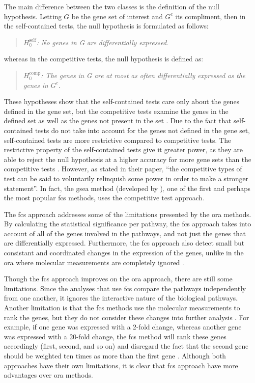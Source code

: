 The main difference between the two classes is the definition of the null hypothesis.
Letting $G$ be the gene set of interest and $G^c$ its compliment, then in the self-contained tests, the null hypothesis is formulated as follows:
\begin{quote}
	\textit{$H_0^{\textrm{self}}$: No genes in G are differentially expressed. }
\end{quote}
whereas in the competitive tests, the null hypothesis is defined as:
\begin{quote}
	\textit{$H_0^{\textrm{comp}}$: The genes in G are at most as often differentially expressed as the genes in $G^c$.
	}
\end{quote}
These hypotheses show that the self-contained tests care only about the genes defined in the gene set, but the competitive tests examine the genes in the defined set as well as the genes not present in the set \citep{Wu2012}.
Due to the fact that self-contained tests do not take into account for the genes not defined in the gene set, self-contained tests are more restrictive compared to competitive tests.
The restrictive property of the self-contained tests give it greater power, as they are able to reject the null hypothesis at a higher accuracy for more gene sets than the competitive tests \citep{Goeman2007}.
However, as \citet{Goeman2007} stated in their paper, ``the competitive types of test can be said to voluntarily relinquish some power in order to make a stronger statement''.
In fact, the \gls{gsea} method (developed by \citet{Subramanian2005}), one of the first and perhaps the most popular \gls{fcs} methods, uses the competitive test approach.

The \Gls{fcs} approach addresses some of the limitations presented by the \gls{ora} methods.
By calculating the statistical significance per pathway, the \gls{fcs} approach takes into account of all of the genes involved in the pathways, and not just the genes that are differentially expressed.
Furthermore, the \gls{fcs} approach also detect small but consistant and coordinated changes in the expression of the genes, unlike in the \gls{ora} where molecular measurements are completely ignored \citep{Khatri2012}.

Though the \gls{fcs} approach improves on the \gls{ora} approach, there are still some limitations.
Since the analyses that use \gls{fcs} compare the pathways independently from one another, it ignores the interactive nature of the biological pathways.
Another limitation is that the \gls{fcs} methods use the molecular measurements to rank the genes, but they do not consider these changes into further analysis \citep{Khatri2012}.
For example, if one gene was expressed with a 2-fold change, whereas another gene was expressed with a 20-fold change, the \gls{fcs} method will rank these genes accordingly (first, second, and so on) and disregard the fact that the second gene should be weighted ten times as more than the first gene \citep{Khatri2012}.
Although both approaches have their own limitations, it is clear that \gls{fcs} approach have more advantages over \gls{ora} methods.

